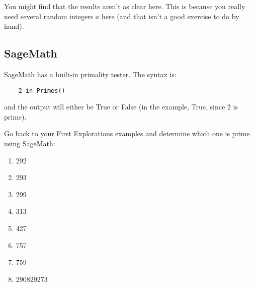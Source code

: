 \documentclass[12pt]{amsart}
\theoremstyle{plain}
\theoremstyle{definition}
\theoremstyle{remark}
\begin{document}
You might find that the results aren't as clear here.  This is because you really need several random integers $a$ here (and that isn't a good exercise to do by hand).\\

\subsection{SageMath} SageMath has a built-in primality tester.  The syntax is:
\begin{lstlisting}
	2 in Primes()
\end{lstlisting}
and the output will either be True or False (in the example, True, since 2 is prime).

Go back to your First Explorations examples and determine which one is prime using SageMath:

\begin{enumerate}[1.]
	\item 292
	\item 293
	\item 299
	\item 313
	\item 427
	\item 757
	\item 759
	\item 290829273
\end{enumerate}
\end{document}
